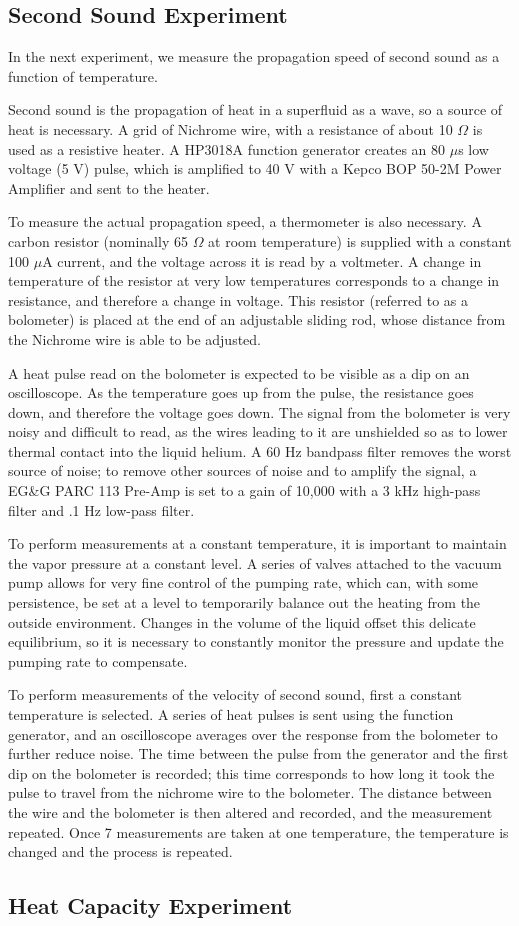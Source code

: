 \subsection{Second Sound Experiment}

In the next experiment, we measure the propagation speed of second sound as a function of temperature.

Second sound is the propagation of heat in a superfluid as a wave, so a source of heat is necessary. A grid of Nichrome wire, with a resistance of about 10 $\Omega$ is used as a resistive heater. A HP3018A function generator creates an 80 $\mu$s low voltage (5 V) pulse, which is amplified to 40 V with a Kepco BOP 50-2M Power Amplifier and sent to the heater. 

To measure the actual propagation speed, a thermometer is also necessary. A carbon resistor (nominally 65 $\Omega$ at room temperature) is supplied with a constant 100 $\mu$A current, and the voltage across it is read by a voltmeter. A change in temperature of the resistor at very low temperatures corresponds to a change in resistance, and therefore a change in voltage. This resistor (referred to as a bolometer) is placed at the end of an adjustable sliding rod, whose distance from the Nichrome wire is able to be adjusted.

A heat pulse read on the bolometer is expected to be visible as a dip on an oscilloscope. As the temperature goes up from the pulse, the resistance goes down, and therefore the voltage goes down. The signal from the bolometer is very noisy and difficult to read, as the wires leading to it are unshielded so as to lower thermal contact into the liquid helium. A 60 Hz bandpass filter removes the worst source of noise; to remove other sources of noise and to amplify the signal, a EG&G PARC 113 Pre-Amp is set to a gain of 10,000 with a 3 kHz high-pass filter and .1 Hz low-pass filter.

To perform measurements at a constant temperature, it is important to maintain the vapor pressure at a constant level. A series of valves attached to the vacuum pump allows for very fine control of the pumping rate, which can, with some persistence, be set at a level to temporarily balance out the heating from the outside environment. Changes in the volume of the liquid offset this delicate equilibrium, so it is necessary to constantly monitor the pressure and update the pumping rate to compensate.

To perform measurements of the velocity of second sound, first a constant temperature is selected. A series of heat pulses is sent using the function generator, and an oscilloscope averages over the response from the bolometer to further reduce noise. The time between the pulse from the generator and the first dip on the bolometer is recorded; this time corresponds to how long it took the pulse to travel from the nichrome wire to the bolometer. The distance between the wire and the bolometer is then altered and recorded, and the measurement repeated. Once 7 measurements are taken at one temperature, the temperature is changed and the process is repeated.

\subsection{Heat Capacity Experiment}

